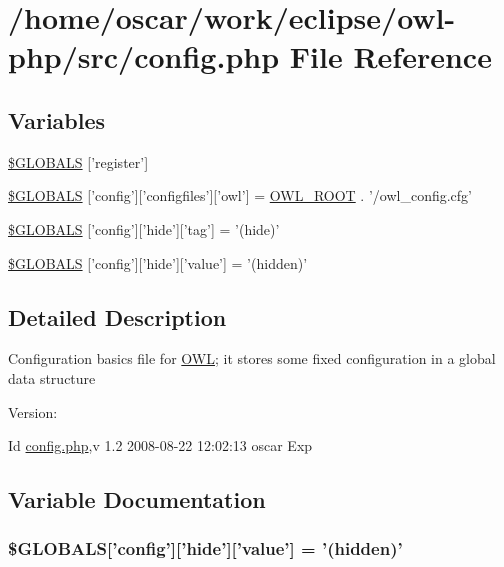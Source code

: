 \hypertarget{config_8php}{
\section{/home/oscar/work/eclipse/owl-php/src/config.php File Reference}
\label{config_8php}
}
\subsection*{Variables}
\begin{CompactItemize}
\item 
\hyperlink{config_8php_6cc1ef3a8c20d69988531d27f931855b}{\$GLOBALS} \mbox{[}'register'\mbox{]}
\item 
\hyperlink{config_8php_36e909583250c43d72bdc7c09e2d4a20}{\$GLOBALS} \mbox{[}'config'\mbox{]}\mbox{[}'configfiles'\mbox{]}\mbox{[}'owl'\mbox{]} = \hyperlink{index_8php_35612f9a6bd7277982731a74593272c4}{OWL\_\-ROOT} . '/owl\_\-config.cfg'
\item 
\hyperlink{config_8php_15cc7b8e0baf358db666b97bd9c7fcf5}{\$GLOBALS} \mbox{[}'config'\mbox{]}\mbox{[}'hide'\mbox{]}\mbox{[}'tag'\mbox{]} = '(hide)'
\item 
\hyperlink{config_8php_7b69aee0b150d2e6556beaff4a99e589}{\$GLOBALS} \mbox{[}'config'\mbox{]}\mbox{[}'hide'\mbox{]}\mbox{[}'value'\mbox{]} = '(hidden)'
\end{CompactItemize}


\subsection{Detailed Description}
Configuration basics file for \hyperlink{classOWL}{OWL}; it stores some fixed configuration in a global data structure \begin{Desc}
\item[Version:]\end{Desc}
\begin{Desc}
\item[Id]\hyperlink{config_8php}{config.php},v 1.2 2008-08-22 12:02:13 oscar Exp \end{Desc}


\subsection{Variable Documentation}
\hypertarget{config_8php_7b69aee0b150d2e6556beaff4a99e589}{
\subsubsection{\setlength{\rightskip}{0pt plus 5cm}\$GLOBALS\mbox{[}'config'\mbox{]}\mbox{[}'hide'\mbox{]}\mbox{[}'value'\mbox{]} = '(hidden)'}}
\label{config_8php_7b69aee0b150d2e6556beaff4a99e589}


